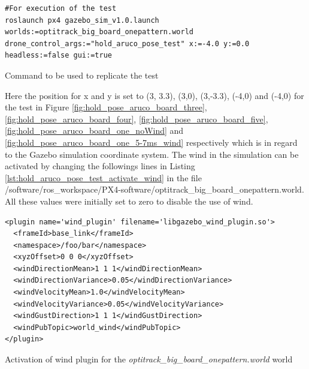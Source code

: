 \documentclass[../Head/report.tex]{subfiles}
\begin{document}
\begin{listing}[H] 
\begin{tcolorbox}[
    enhanced,
    attach boxed title to top left={xshift=6mm,yshift=-3mm},
    colback=lightgreen!20,
    colframe=lightgreen,
    fonttitle=\bfseries\color{black},
]
\begin{verbatim}
#For execution of the test
roslaunch px4 gazebo_sim_v1.0.launch worlds:=optitrack_big_board_onepattern.world drone_control_args:="hold_aruco_pose_test" x:=-4.0 y:=0.0 headless:=false gui:=true
\end{verbatim}
\end{tcolorbox}
\caption{Command to be used to replicate the test}
\label{lst:hold_aruco_pose_test}    
\end{listing} 

Here the position for x and y is set to (3, 3.3), (3,0), (3,-3.3), (-4,0) and (-4,0) for the test in Figure \ref{fig:hold_pose_aruco_board_three}, \ref{fig:hold_pose_aruco_board_four}, \ref{fig:hold_pose_aruco_board_five}, \ref{fig:hold_pose_aruco_board_one_noWind} and \ref{fig:hold_pose_aruco_board_one_5-7ms_wind} respectively which is in regard to the Gazebo simulation coordinate system. The wind in the simulation can be activated by changing the followings lines in Listing \ref{lst:hold_aruco_pose_test_activate_wind} in the file /software/ros\_workspace/PX4-software/optitrack\_big\_board\_onepattern.world. All these values were initially set to zero to disable the use of wind. 

\begin{listing}[H] 
\begin{tcolorbox}[
    enhanced,
    attach boxed title to top left={xshift=6mm,yshift=-3mm},
    colback=lightgreen!20,
    colframe=lightgreen,
    fonttitle=\bfseries\color{black},
]
\begin{verbatim}
<plugin name='wind_plugin' filename='libgazebo_wind_plugin.so'>
  <frameId>base_link</frameId>
  <namespace>/foo/bar</namespace>
  <xyzOffset>0 0 0</xyzOffset>
  <windDirectionMean>1 1 1</windDirectionMean>
  <windDirectionVariance>0.05</windDirectionVariance>
  <windVelocityMean>1.0</windVelocityMean>
  <windVelocityVariance>0.05</windVelocityVariance>
  <windGustDirection>1 1 1</windGustDirection>
  <windPubTopic>world_wind</windPubTopic>
</plugin>
\end{verbatim}
\end{tcolorbox}
\caption{Activation of wind plugin for the \textit{optitrack\_big\_board\_onepattern.world} world}
\label{lst:hold_aruco_pose_test_activate_wind}    
\end{listing} 
\end{document}
